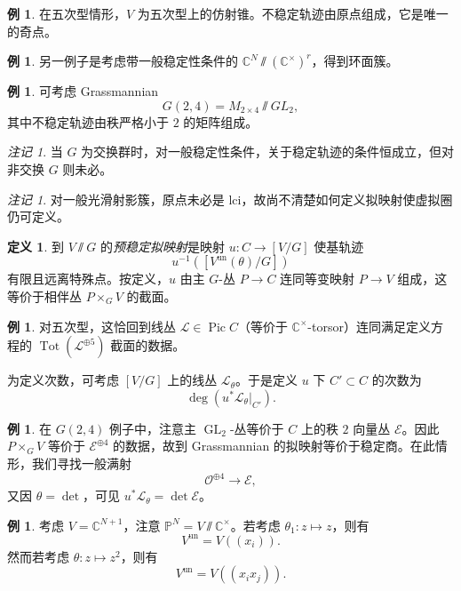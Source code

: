 \documentclass{amsart}
\theoremstyle{definition}
\newtheorem{defn}[thm]{定义}
\newtheorem{exm}[thm]{例}
\theoremstyle{remark}
\newtheorem{rmk}[thm]{注记}
\theoremstyle{plain}
\theoremstyle{definition}
\theoremstyle{remark}
\newcommand{\C}{\mathbb{C}}
\renewcommand{\P}{\mathbb{P}}
\newcommand{\mc}[1]{\mathcal{#1}}
\newcommand{\mr}[1]{\mathrm{#1}}
\newcommand{\on}[1]{\operatorname{#1}}
\newcommand{\1}{\mathbf{1}}
\newcommand{\2}{\mathbf{2}}
\newcommand{\3}{\mathbf{3}}
\DeclareMathOperator{\Pic}{Pic}
\begin{document}
\begin{exm}
    在五次型情形，\(V\) 为五次型上的仿射锥。不稳定轨迹由原点组成，它是唯一的奇点。
\end{exm}

\begin{exm}
    另一例子是考虑带一般稳定性条件的 \(\C^N \sslash (\C^{\times})^r\)，得到环面簇。
\end{exm}

\begin{exm}
    可考虑 Grassmannian
    \[ G(2,4) = M_{2\times 4} \sslash GL_2, \]
    其中不稳定轨迹由秩严格小于 \(2\) 的矩阵组成。
\end{exm}

\begin{rmk}
    当 \(G\) 为交换群时，对一般稳定性条件，关于稳定轨迹的条件恒成立，但对非交换 \(G\) 则未必。
\end{rmk}

\begin{rmk}
    对一般光滑射影簇，原点未必是 lci，故尚不清楚如何定义拟映射使虚拟圈仍可定义。
\end{rmk}

\begin{defn}
    到 \(V \sslash G\) 的\textit{预稳定拟映射}是映射 \(u \colon C \to [V/G]\) 使基轨迹
    \[ u^{-1}([V^{\mr{un}}(\theta) / G]) \]
    有限且远离特殊点。按定义，\(u\) 由主 \(G\)-丛 \(P \to C\) 连同等变映射 \(P \to V\) 组成，这等价于相伴丛 \(P \times_G V\) 的截面。
\end{defn}

\begin{exm}
    对五次型，这恰回到线丛 \(\mc{L} \in \Pic C\)（等价于 \(\C^{\times}\)-torsor）连同满足定义方程的 \(\on{Tot}(\mc{L}^{\oplus 5})\) 截面的数据。
\end{exm}

为定义次数，可考虑 \([V/G]\) 上的线丛 \(\mc{L}_{\theta}\)。于是定义 \(u\) 下 \(C' \subset C\) 的次数为
\[ \deg (u^* \mc{L}_{\theta}|_{C'}). \]

\begin{exm}
    在 \(G(2,4)\) 例子中，注意主 \(\on{GL}_2\)-丛等价于 \(C\) 上的秩 \(2\) 向量丛 \(\mc{E}\)。因此 \(P \times_G V\) 等价于 \(\mc{E}^{\oplus 4}\) 的数据，故到 Grassmannian 的拟映射等价于稳定商。在此情形，我们寻找一般满射
    \[ \mc{O}^{\oplus 4} \to \mc{E}, \]
    又因 \(\theta = \det\)，可见 \(u^* \mc{L}_{\theta} = \det \mc{E}\)。
\end{exm}

\begin{exm}
    考虑 \(V = \C^{N+1}\)，注意 \(\P^N = V \sslash \C^{\times}\)。若考虑 \(\theta_1 \colon z \mapsto z\)，则有
    \[ V^{\on{un}} = V((x_i)). \]
    然而若考虑 \(\theta \colon z \mapsto z^2\)，则有
    \[ V^{\on{un}} = V((x_i x_j)). \]
\end{exm}
\end{document}
